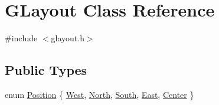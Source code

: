 \hypertarget{classGLayout}{}\section{G\+Layout Class Reference}
\label{classGLayout}


{\ttfamily \#include $<$glayout.\+h$>$}

\subsection*{Public Types}
\begin{DoxyCompactItemize}
\item 
enum \mbox{\hyperlink{classGLayout_ab91b34ae619fcdfcba4522b4f335bf83}{Position}} \{ \mbox{\hyperlink{classGLayout_ab91b34ae619fcdfcba4522b4f335bf83aedd15c5b13ad5525c46d5c9650ddde5f}{West}}, 
\mbox{\hyperlink{classGLayout_ab91b34ae619fcdfcba4522b4f335bf83aaeb9634ef4d4fd4a5297ada06f89c3fe}{North}}, 
\mbox{\hyperlink{classGLayout_ab91b34ae619fcdfcba4522b4f335bf83ac15660611b40cfc69e36003c8607311a}{South}}, 
\mbox{\hyperlink{classGLayout_ab91b34ae619fcdfcba4522b4f335bf83a66183dce5a3b8d48fbdfe1f8ede7fcc2}{East}}, 
\mbox{\hyperlink{classGLayout_ab91b34ae619fcdfcba4522b4f335bf83aaa79b7c40b072fdcab65bfa11d732389}{Center}}
 \}
\end{DoxyCompactItemize}
